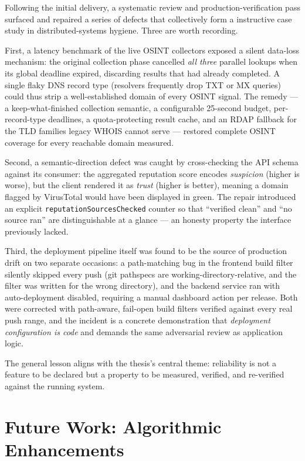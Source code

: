 Following the initial delivery, a systematic review and
production-verification pass surfaced and repaired a series of defects
that collectively form a instructive case study in distributed-systems
hygiene. Three are worth recording.

First, a latency benchmark of the live OSINT collectors exposed a
silent data-loss mechanism: the original collection phase cancelled
\emph{all three} parallel lookups when its global deadline expired,
discarding results that had already completed. A single flaky DNS
record type (resolvers frequently drop TXT or MX queries) could thus
strip a well-established domain of every OSINT signal. The remedy --- a
keep-what-finished collection semantic, a configurable 25-second
budget, per-record-type deadlines, a quota-protecting result cache, and
an RDAP fallback for the TLD families legacy WHOIS cannot serve ---
restored complete OSINT coverage for every reachable domain measured.

Second, a semantic-direction defect was caught by cross-checking the
API schema against its consumer: the aggregated reputation score
encodes \emph{suspicion} (higher is worse), but the client rendered it
as \emph{trust} (higher is better), meaning a domain flagged by
VirusTotal would have been displayed in green. The repair introduced an
explicit \texttt{reputationSourcesChecked} counter so that ``verified
clean'' and ``no source ran'' are distinguishable at a glance --- an
honesty property the interface previously lacked.

Third, the deployment pipeline itself was found to be the source of
production drift on two separate occasions: a path-matching bug in the
frontend build filter silently skipped every push (git pathspecs are
working-directory-relative, and the filter was written for the wrong
directory), and the backend service ran with auto-deployment disabled,
requiring a manual dashboard action per release. Both were corrected
with path-aware, fail-open build filters verified against every real
push range, and the incident is a concrete demonstration that
\emph{deployment configuration is code} and demands the same
adversarial review as application logic.

The general lesson aligns with the thesis's central theme: reliability
is not a feature to be declared but a property to be measured,
verified, and re-verified against the running system.

\section{Future Work: Algorithmic
Enhancements}\label{future-work-algorithmic-enhancements}

